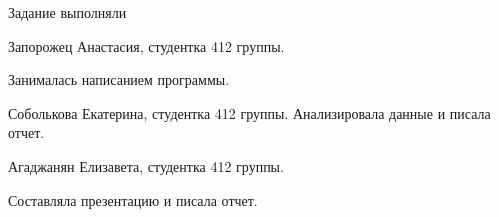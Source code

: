 \documentclass{beamer}
\begin{document}
\begin{frame}



\end{frame}
\begin{frame}{Задание выполняли} 
\begin{itemize} 
	{ \item Запорожец Анастасия, студентка 412 группы. 
		
		Занималась написанием программы.
		\item Соболькова Екатерина, студентка 412 группы. Анализировала данные и писала отчет.
		\item Агаджанян Елизавета, студентка 412 группы. 
		
		Составляла презентацию и писала отчет. 
	} 
\end{itemize}
\end{frame}
\end{document}
